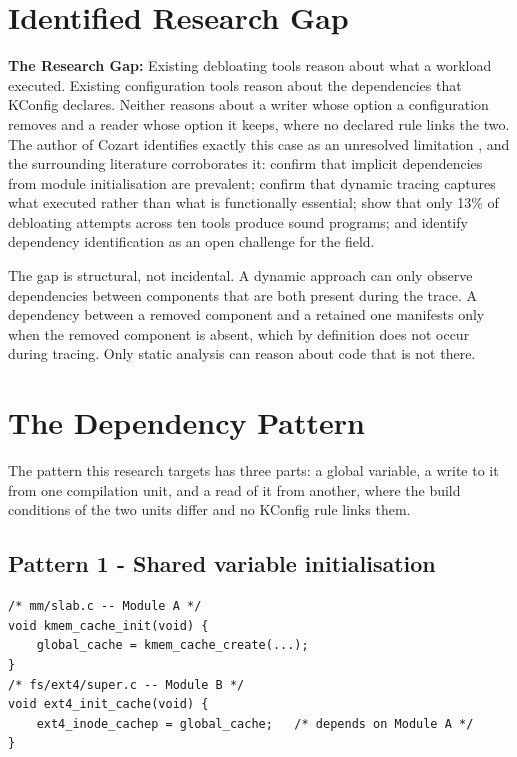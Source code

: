 \documentclass[12pt, a4paper, oneside]{book}
\begin{document}
\section{Identified Research Gap}

\textbf{The Research Gap:} Existing debloating tools reason about what a workload
executed. Existing configuration tools reason about the dependencies that KConfig
declares. Neither reasons about a writer whose option a configuration removes and
a reader whose option it keeps, where no declared rule links the two. The author
of Cozart identifies exactly this case as an unresolved limitation
\citep{kuo2022dissertation}, and the surrounding literature corroborates it:
\citet{hao2022demystifying} confirm that implicit dependencies from module
initialisation are prevalent; \citet{gunasekaran2025lean} confirm that dynamic
tracing captures what executed rather than what is functionally essential;
\citet{brown2024broad} show that only 13\% of debloating attempts across ten
tools produce sound programs; and \citet{alhanahnah2024sok} identify dependency
identification as an open challenge for the field.

The gap is structural, not incidental. A dynamic approach can only observe
dependencies between components that are both present during the trace. A
dependency between a removed component and a retained one manifests only when the
removed component is absent, which by definition does not occur during tracing.
Only static analysis can reason about code that is not there.

\section{The Dependency Pattern}

The pattern this research targets has three parts: a global variable, a write to
it from one compilation unit, and a read of it from another, where the build
conditions of the two units differ and no KConfig rule links them.

\subsection*{Pattern 1 - Shared variable initialisation}

\begin{verbatim}
/* mm/slab.c -- Module A */
void kmem_cache_init(void) {
    global_cache = kmem_cache_create(...);
}
/* fs/ext4/super.c -- Module B */
void ext4_init_cache(void) {
    ext4_inode_cachep = global_cache;   /* depends on Module A */
}
\end{verbatim}
\end{document}
